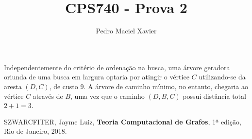 \documentclass{homework}
\title{CPS740 - Prova 2}
\author{Pedro Maciel Xavier}
\begin{document}
	
	
	\quest
	
	\begin{fig}
		
	\end{fig}
	
	
	
	
	\subquest%
	
	\subquest%
	
	\subquest Independentemente do critério de ordenação na busca, uma árvore geradora oriunda de uma busca em largura optaria por atingir o vértice $C$ utilizando-se da aresta $(D, C)$, de custo $9$. A árvore de caminho mínimo, no entanto, chegaria ao vértice $C$ através de $B$, uma vez que o caminho $(D, B, C)$ possui distância total $2 + 1 = 3$.
	
	\subquest
	
	\subquest

	\quest

	\subquest
	
	\subquest
	
	\subquest
	
	\subquest	
	\begin{thebibliography}{10}
		 SZWARCFITER, Jayme Luiz, \textbf{Teoria Computacional de Grafos}, 1ª edição, Rio de Janeiro, 2018.
	\end{thebibliography}
	\newpage
	\let\clearpage\relax
\end{document}
